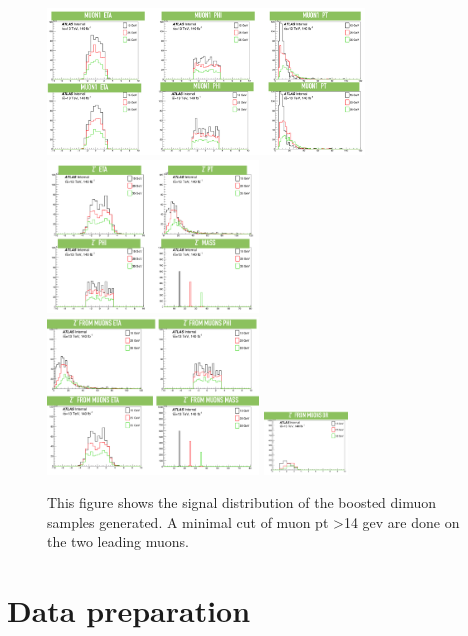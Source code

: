 \begin{figure}[!htb]
    \begin{center}
        \includegraphics[width=0.75\textwidth]{figures/chapter_dimuon/dimuonISRdist1}
        \includegraphics[width=0.5\textwidth]{figures/chapter_dimuon/dimuonISRdist2}
        \includegraphics[width=0.5\textwidth]{figures/chapter_dimuon/dimuonISRdist3}
        \includegraphics[width=0.2\textwidth]{figures/chapter_dimuon/dimuonISRdist4}
        \caption{
        This figure shows the signal distribution of the boosted dimuon samples generated. A minimal cut of muon pt >14 gev are done on the two leading muons. }
            \label{fig:boosted}
    \end{center}
\end{figure}


\section{Data preparation}

